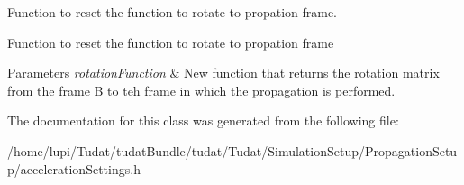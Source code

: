 Function to reset the function to rotate to propation frame. 

Function to reset the function to rotate to propation frame 
\begin{DoxyParams}{Parameters}
{\em rotation\+Function} & New function that returns the rotation matrix from the frame B to teh frame in which the propagation is performed. \\
\hline
\end{DoxyParams}


The documentation for this class was generated from the following file\+:\begin{DoxyCompactItemize}
\item 
/home/lupi/\+Tudat/tudat\+Bundle/tudat/\+Tudat/\+Simulation\+Setup/\+Propagation\+Setup/acceleration\+Settings.\+h\end{DoxyCompactItemize}
